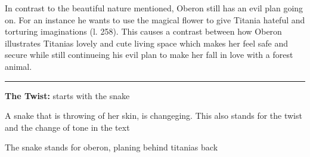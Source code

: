 In contrast to the beautiful nature mentioned, Oberon still has an evil plan
going on. For an instance he wants to use the magical flower to give Titania
hateful and torturing imaginations (l. 258). This causes a contrast between how
Oberon illustrates Titanias lovely and cute living space which makes her feel
safe and secure while still continueing his evil plan to make her fall in love
with a forest animal.

\blank
\hrule
\blank

{\bf The Twist:} starts with the snake

\startitemize[m,packed]
\item A snake that is throwing of her skin, is changeging. This also stands for the twist and the change of tone in the text
\item The snake stands for oberon, planing behind titanias back
\stopitemize
